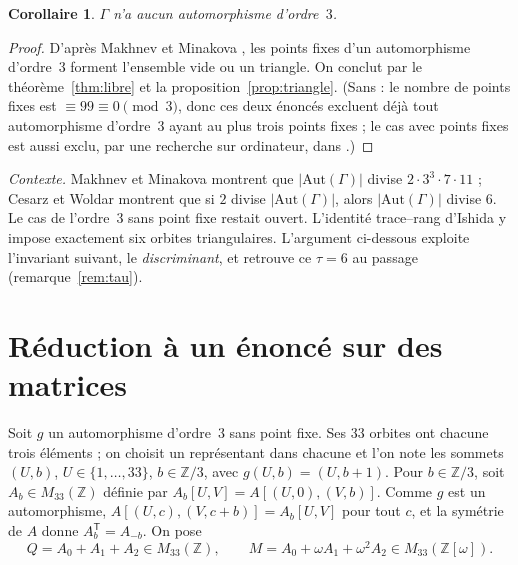\documentclass[11pt,a4paper]{article}
\newtheorem{corollary}[theorem]{Corollaire}
\theoremstyle{remark}
\newcommand{\Z}{\mathbb{Z}}
\begin{document}
\begin{corollary}\label{cor:tout}
$\Gamma$ n'a aucun automorphisme d'ordre~$3$.
\end{corollary}
\begin{proof}
D'après Makhnev et Minakova \cite{MM04}, les points fixes d'un automorphisme d'ordre~3 forment l'ensemble vide ou un triangle.
On conclut par le théorème~\ref{thm:libre} et la proposition~\ref{prop:triangle}. (Sans \cite{MM04} : le nombre de points fixes
est $\equiv 99\equiv0\pmod3$, donc ces deux énoncés excluent déjà tout automorphisme d'ordre~3 ayant au plus trois points fixes ; le cas avec points fixes est aussi exclu, par une recherche sur
ordinateur, dans \cite{B09,BL11}.)
\end{proof}

\emph{Contexte.} Makhnev et Minakova montrent que $|\mathrm{Aut}(\Gamma)|$ divise $2\cdot 3^3\cdot 7\cdot 11$ ; Cesarz et Woldar
\cite{CW23} montrent que si $2$ divise $|\mathrm{Aut}(\Gamma)|$, alors $|\mathrm{Aut}(\Gamma)|$ divise $6$. Le cas de l'ordre~3 sans
point fixe restait ouvert. L'identité trace--rang d'Ishida \cite{I26} y impose exactement six orbites triangulaires. L'argument
ci-dessous exploite l'invariant suivant, le \emph{discriminant}, et retrouve ce $\tau=6$ au passage (remarque~\ref{rem:tau}).

\section{Réduction à un énoncé sur des matrices}

Soit $g$ un automorphisme d'ordre~3 sans point fixe. Ses $33$ orbites ont chacune trois éléments ; on choisit un représentant dans
chacune et l'on note les sommets $(U,b)$, $U\in\{1,\dots,33\}$, $b\in\Z/3$, avec $g(U,b)=(U,b+1)$. Pour $b\in\Z/3$, soit
$A_b\in M_{33}(\Z)$ définie par $A_b[U,V]=A[(U,0),(V,b)]$. Comme $g$ est un automorphisme, $A[(U,c),(V,c+b)]=A_b[U,V]$ pour tout
$c$, et la symétrie de $A$ donne $A_b^{\mathsf T}=A_{-b}$. On pose
\[
Q=A_0+A_1+A_2\in M_{33}(\Z),\qquad M=A_0+\omega A_1+\omega^2A_2\in M_{33}(\Z[\omega]).
\]
\end{document}
